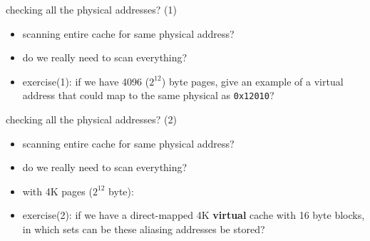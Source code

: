 \begin{frame}{checking all the physical addresses? (1)}
    \begin{itemize}
    \item scanning entire cache for same physical address?
    \item do we really need to scan everything?
    \vspace{.5cm}
\item<2-> exercise(1): if we have 4096 ($2^{12}$) byte pages, give an example of a virtual address that could
          map to the same physical as \texttt{0x12010}?
    \iftoggle{heldback}{}{
    \item<3-> must have same page offset, so 0x0010, 0x1010, 0x2010, 0x3010, etc.
    }
    \end{itemize}
\end{frame}
\begin{frame}{checking all the physical addresses? (2)}
    \begin{itemize}
    \item scanning entire cache for same physical address?
    \item do we really need to scan everything?
    \vspace{.5cm}
    \item with 4K pages ($2^{12}$ byte):
    \item exercise(2): if we have a direct-mapped 4K \textbf{virtual} cache with 16 byte blocks,
          in which sets can be these aliasing addresses be stored?
    \end{itemize}
\end{frame}

